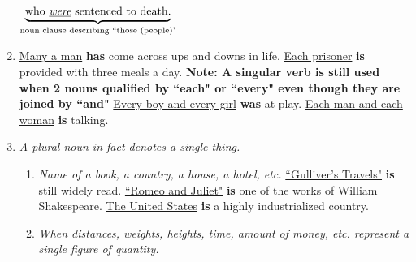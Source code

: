 \begin{enumerate}
{        $\underbrace{\text{who \underline{{\it were}} sentenced to death.}}_
        {\text{noun clause describing ``those (people)"}}$}
    \item
        \newline
        \newline
        \underline{Many a man} \textbf{has} come across ups and downs in life.
        \newline
        \newline
        \underline{Each prisoner} \textbf{is} provided with three meals a day.
        \newline
        \newline
        \textbf{Note: A singular verb is still used when 2 nouns qualified by
        ``each" or ``every" even though they are joined by ``and"}
        \newline
        \newline
        \underline{Every boy and every girl} \textbf{was} at play.
        \newline
        \newline
        \underline{Each man and each woman} \textbf{is} talking.
    \item
        {\it
        A plural noun in fact denotes a single thing.
        }
        \begin{enumerate}
            \item
                {\it
                Name of a book, a country, a house, a hotel, etc.
                }
                \newline
                \newline
                \underline{``Gulliver's Travels"} \textbf{is} still widely read.
                \newline
                \newline
                \underline{``Romeo and Juliet"} \textbf{is} one of the works of William Shakespeare.
                \newline
                \newline
                \underline{The United States} \textbf{is} a highly industrialized country.
            \item
                {\it
                When distances, weights, heights, time, amount of money, etc.
                represent a single figure of quantity.
}
\end{enumerate}
\end{enumerate}
